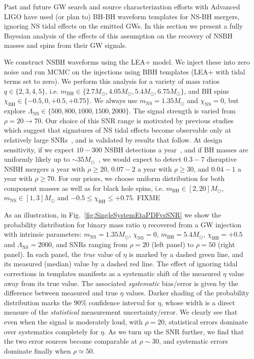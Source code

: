 \documentclass[aps,prd,amsmath,floats,floatfix, twocolumn,
superscriptaddress,nofootinbib,showpacs]{revtex4-1}
\newcommand{\prayush}{\textcolor{red!40!black}}
\newcommand{\lambdans}{\Lambda_\mathrm{NS}}
\newcommand{\chibh}{\chi_\mathrm{BH}}
\newcommand{\chins}{\chi_\mathrm{NS}}
\newcommand{\mbh}{m_\mathrm{BH}}
\newcommand{\mns}{m_\mathrm{NS}}
\begin{document}
% 
% 
Past and future GW search and source characterization efforts with Advanced LIGO
have used (or plan to) BH-BH waveform templates for NS-BH mergers, ignoring
NS tidal effects on the emitted GWs. In this section we present a fully
Bayesian analysis of the effects of this assumption on the recovery of NSBH
masses and spins from their GW signals.


We construct NSBH waveforms using the LEA+ model. We inject these into zero
noise and run MCMC on the injections using BBH templates (LEA+ with tidal terms
set to zero). We perform this analysis for a variety of mass ratios
$q\in\{2,3,4,5\}$, i.e. $\mbh\in\{2.7M_\odot, 4.05M_\odot, 5.4M_\odot, 6.75M_\odot\}$,
and BH spins $\chibh\in\{-0.5, 0, +0.5, +0.75\}$. We always use $\mns=1.35M_\odot$ and
$\chins=0$, but explore $\lambdans\in\{500, 800, 1000, 1500, 2000\}$. The signal
strength is varied from $\rho=20\rightarrow70$. Our choice of this SNR range is
motivated by previous studies which suggest that signatures of NS tidal effects
become observable only at relatively large SNRs~\cite{Lackey:2013axa}, and is validated
by results that follow. At design sensitivity, if we expect $10-300$ NSBH detections 
a year~\cite{Abadie:2010cfa}, and if BH masses are uniformly likely up to
$\sim 35M_\odot$~\cite{LIGOVirgo2016a}, we would expect to detect $0.3-7$ disruptive
NSBH mergers a year with $\rho\geq 20$, $0.07-2$ a year with $\rho\geq 30$, and $0.04-1$ a
year with $\rho\geq 70$. For our priors, we choose uniform distribution for 
both component masses as well as for black hole spins, i.e. $\mbh\in[2,20]M_\odot$,
$\mns\in[1,3]M_\odot$ and $-0.5\leq \chibh\leq +0.75$. \prayush{FIXME}



As an illustration, in Fig.~\ref{fig:SingleSystemEtaPDFvsSNR} we show the
probability distribution for binary mass ratio $\eta$ recovered from a GW
injection with intrinsic parameters: $\mns=1.35M_\odot$, $\chins=0$,
$\mbh=5.4M_\odot$, $\chibh=+0.5$ and $\lambdans=2000$, and SNRs ranging
from $\rho=20$ (left panel) to $\rho=50$ (right panel). In each panel, the
{\it true} value of $\eta$ is marked by a dashed green line, and its measured
(median) value by a dashed red line. The effect of ignoring tidal corrections
in templates manifests as a systematic shift of the measured $\eta$ value away
from its true value. The associated {\it systematic} bias/error is given by the
difference between measured and true $\eta$ values. Darker shading of the
probability distribution marks the $90\%$ confidence interval for $\eta$, whose
width is a direct measure of the {\it statistical} measurement uncertainty/error.
% 
We clearly see that even when the signal is moderately loud, with $\rho=20$,
statistical errors dominate over systematics completely for $\eta$.
As we turn up the SNR
further, we find that the two error sources become comparable at $\rho\sim 30$,
and systematic errors dominate finally when $\rho\simeq 50$.
\end{document}
